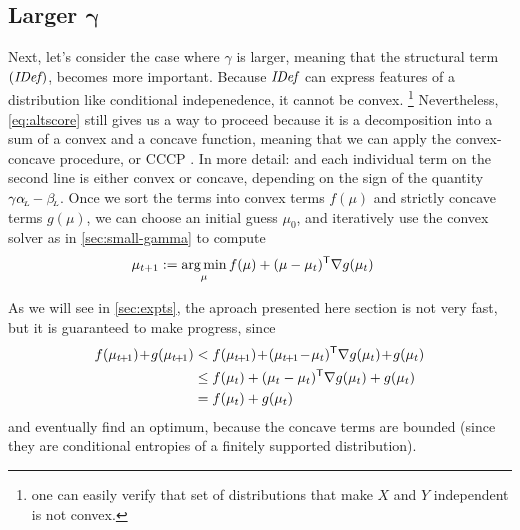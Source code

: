\documentclass[twoside]{article}
\begin{document}
\subsection{Larger
    \texorpdfstring{$\boldsymbol\gamma$}{gamma}}
    \label{sec:larger-gamma}

Next, let's consider the case where $\gamma$ is
larger, meaning that the structural term $(\mathit{IDef}_{\!})$,
becomes more important.
Because $\mathit{IDef}_{\!}$ can express features of a distribution like conditional indepenedence,
it cannot be convex.%
    \footnote{one can easily verify that set of distributions that make $X$ and $Y$ independent is not convex.}
Nevertheless, \eqref{eq:altscore} still gives us a way to proceed because it is a decomposition into a sum of a convex and a concave function, meaning that we can apply the convex-concave procedure, or CCCP \parencite{yuille2003concave}.
In more detail: and each individual term on the second line is either convex or concave, depending on the sign of the quantity $\gamma \alpha_{\!_{L}\!} - \beta_{\!_{L}\!}$.
Once we sort the terms into convex terms $f(\mu)$ and strictly concave terms $g(\mu)$, we can choose an initial guess $\mu_0$, and iteratively use the convex solver as in \cref{sec:small-gamma} to compute
%
\begin{align*}
    \mu_{t+1} &:= \operatorname*{arg\,min}_{\mu} f(\mu) + (\mu - \mu_{t})^{\sf T}
        \nabla g(\mu_t)
\end{align*}

As we will see in \cref{sec:expts}, the aproach presented here section is
not very fast, but it is guaranteed to make progress, since
\def\tplus1{{t\mskip-2mu+\mskip-2mu1}}
\begin{align*}
    f(\mu_\tplus1) \!+\! g(\mu_\tplus1) &<  f(\mu_\tplus1) \!+\! (\mu_\tplus1 \!-\! \mu_t)^{\sf T} \nabla g(\mu_t) \!+\! g(\mu_t)
        \\
    &\le  f(\mu_t) + (\mu_t - \mu_{t})^{\sf T}\nabla g(\mu_t)  + g(\mu_t)
    \\
&= f(\mu_t) + g(\mu_t)
\end{align*}
and eventually find an optimum, because the concave terms are bounded (since they are conditional entropies of a finitely supported distribution).


\end{document}
